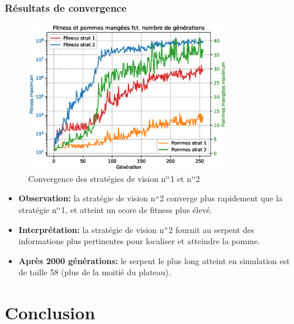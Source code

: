 \documentclass[10pt]{beamer}
\begin{document}
\begin{frame}
\frametitle{Résultats de convergence}
\begin{figure}
\vspace{-0.3cm}
\includegraphics[width=0.8\textwidth]{curve_compare_cv.eps}
\vspace{-0.4cm}
\caption*{\tiny Convergence des stratégies de vision n$\textsuperscript{o}$1 et n$\textsuperscript{o}$2}
\end{figure}
\vspace{-0.6cm}
\begin{itemize}
\footnotesize
\item \textbf{Observation:} la stratégie de vision n$\textsuperscript{o}$2 converge plus rapidement que la stratégie n$\textsuperscript{o}$1, et atteint un score de fitness plus élevé.
\item \textbf{Interprétation:} la stratégie de vision n$\textsuperscript{o}$2 fournit au serpent des informations plus pertinentes pour localiser et atteindre la pomme.
\item \textbf{Après 2000 générations:} le serpent le plus long atteint en simulation est de taille 58 (plus de la moitié du plateau).
\end{itemize}

\end{frame}

\section{Conclusion}
\end{document}
